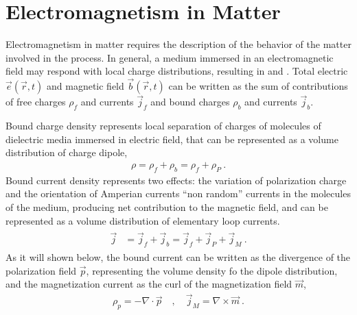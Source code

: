 \documentclass[letterpaper,10pt,english]{jupyterBook}
\begin{document}
\section{Electromagnetism in Matter}
\label{\detokenize{ch/principles-matter:electromagnetism-in-matter}}\label{\detokenize{ch/principles-matter:classical-electromagnetism-principles-matter}}\label{\detokenize{ch/principles-matter::doc}}
\sphinxAtStartPar
Electromagnetism in matter requires the description of the behavior of the matter involved in the process. In general, a medium immersed in an electromagnetic field may respond with local charge distributions, resulting in {\hyperref[\detokenize{ch/principles-matter-polarization:classical-electromagnetism-media-polarization}]{}} and {\hyperref[\detokenize{ch/principles-matter-magnetization:classical-electromagnetism-media-magnetization}]{}}. Total electric \(\vec{e}(\vec{r},t)\) and magnetic field \(\vec{b}(\vec{r},t)\) can be written as the sum of contributions of free charges \(\rho_f\) and currents \(\vec{j}_f\) and bound charges \(\rho_b\) and currents \(\vec{j}_b\).

\sphinxAtStartPar
Bound charge density represents local separation of charges of molecules of dielectric media immersed in electric field, that can be represented as a volume distribution of charge dipole,
\begin{equation*}
\begin{split}\rho = \rho_f + \rho_b = \rho_f + \rho_P \ .\end{split}
\end{equation*}
\sphinxAtStartPar
Bound current density represents two effects: the variation of polarization charge and the orientation of Amperian currents \sphinxhyphen{} “non random” currents in the molecules of the medium, producing net contribution to the magnetic field, and can be represented as a volume distribution of elementary loop currents.
\begin{equation*}
\begin{split}\begin{aligned}
  \vec{j} & = \vec{j}_f + \vec{j}_b 
            = \vec{j}_f + \vec{j}_P + \vec{j}_M  \ .
\end{aligned}\end{split}
\end{equation*}
\sphinxAtStartPar
As it will shown below, the bound current can be written as the divergence of the polarization field \(\vec{p}\), representing the volume density fo the dipole distribution, and the magnetization current as the curl of the magnetization field \(\vec{m}\),
\begin{equation*}
\begin{split}\rho_p = - \nabla \cdot \vec{p} \quad , \quad \vec{j}_M = \nabla \times \vec{m} \ .\end{split}
\end{equation*}
\end{document}
